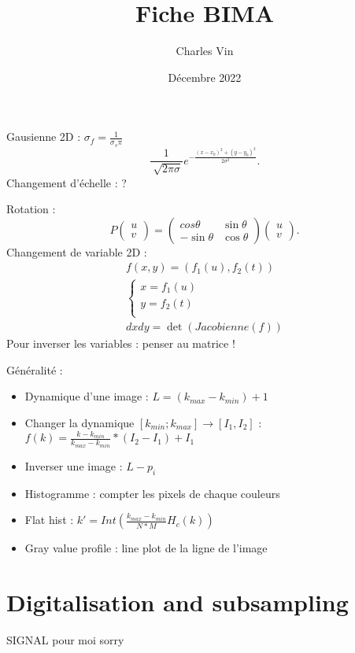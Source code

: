 \documentclass{article}
\title{Fiche BIMA}
\author{Charles Vin}
\date{Décembre 2022}
\theoremstyle{plain}%
\theoremstyle{definition}
\theoremstyle{remark}
\begin{document}
\maketitle
\tableofcontents

Gausienne 2D : $ \sigma _f = \frac{1}{\sigma _s \pi } $ 
\[
    \frac{1}{\sqrt[]{2 \pi \sigma }} e^{- \frac{(x-x_0)^2 + (y-y_0)^2}{2 \sigma ^2}}
.\]
Changement d'échelle : ?

Rotation : 
\[
    P \begin{pmatrix}
        u \\
        v
    \end{pmatrix} = \begin{pmatrix}
        cos \theta & \sin \theta \\
        - \sin \theta & \cos \theta 
    \end{pmatrix} \begin{pmatrix}
        u \\
        v
    \end{pmatrix}
.\]
Changement de variable 2D : \begin{align*}
    f(x,y) = (f_1(u), f_2(t)) \\
    \begin{cases}
    x = f_1(u)\\
    y = f_2(t)\\
    \end{cases} \\
    dxdy = \det (Jacobienne(f))
\end{align*}
Pour inverser les variables : penser au matrice ! 

Généralité : 
\begin{itemize}
    \item Dynamique d'une image : $ L = (k_{max} - k_{min}) + 1 $ 
    \item Changer la dynamique $ [k_{min};k_{max}] \to [I_1, I_2] $  : $ f(k) = \frac{k - k_{min}}{k_{max} - k_{min}} * (I_2 - I_1) + I_1 $ 
    \item Inverser une image : $ L - p_i $ 
    \item Histogramme : compter les pixels de chaque couleurs
    \item Flat hist : $ k' = Int(\frac{k_{max} - k_{min}}{N*M}H_c(k)) $ 
    \item Gray value profile : line plot de la ligne de l'image
\end{itemize}

\section{Digitalisation and subsampling}
SIGNAL pour moi sorry
\end{document}
